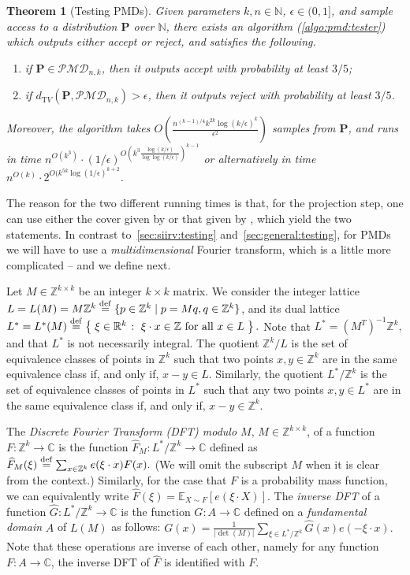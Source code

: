 \documentclass[11pt]{article}
\newtheorem{theorem}{Theorem}[section]
\theoremstyle{definition}
\newcommand{\R}{\mathbb{R}}
\newcommand{\C}{\mathbb{C}}
\newcommand{\Z}{\mathbb{Z}}
\newcommand{\N}{\mathbb{N}}
\newcommand{\E}{\mathbb{E}}
\newcommand{\p}{\mathbf{P}}
\newcommand{\dtv}{d_{\mathrm TV}}
\newcommand{\eps}{\epsilon}
\newcommand{\eqdef}{\stackrel{{\mathrm {\footnotesize def}}}{=}}
\newcommand{\setOfSuchThat}[2]{ \left\{\; #1 \;\colon\; #2\; \right\} } 			\newcommand{\clg}[1]{\left\lceil #1 \right\rceil}
\newcommand{\accept}{\textsf{accept}\xspace}
\newcommand{\reject}{\textsf{reject}\xspace}
\newcommand{\bigO}[1]{{O\left( #1 \right)}}
\newcommand{\classpmd}[2][n]{\ensuremath{\mathcal{PMD}_{#1,#2}}\xspace}
\begin{document}
\begin{theorem}[Testing PMDs]
    Given parameters $k,n\in\mathbb{N}$, $\eps\in(0,1]$, and sample access to a distribution $\p$ over $\N$, there exists an algorithm (\cref{algo:pmd:tester}) which outputs either \accept or \reject, and satisfies the following.
    \begin{enumerate}
        \item if $\p \in \classpmd[n]{k}$, then it outputs \accept with probability at least $3/5$;
        \item if $\dtv(\p,\classpmd[n]{k}) > \eps$, then it outputs \reject with probability at least $3/5$.
    \end{enumerate}
    Moreover, the algorithm takes $\bigO{\frac{n^{(k-1)/4} k^{2k} \log(k/\eps)^k}{\eps^2}}$ samples from $\p$, and runs in time $n^{O(k^3)} \cdot (1/\eps)^{O(k^3\frac{\log(k/\eps)}{\log\log(k/\eps)})^{k-1}}$ or alternatively in time $n^{O(k)} \cdot  2^{O(k^{5k} \log(1/\eps)^{k+2}}$.
\end{theorem}
The reason for the two different running times is that, for the projection step, one can use either the cover given by \cite{DKS15b} or that given by \cite{DDKT16}, which yield the two statements.
In contrast to~\cref{sec:siirv:testing} and~\cref{sec:general:testing}, for PMDs we will have to use a \emph{multidimensional} Fourier transform, which is a little more complicated -- and we define next.


Let $M \in \Z^{k \times k}$ be an integer $k \times k$ matrix.
We consider the integer lattice
$L  = L(M) =  M \Z^k \eqdef \{ p \in \Z^k \mid p = M q,  q \in \Z^k \}$, and its dual lattice
 $L^{\ast} = L^{\ast}(M)   \eqdef \setOfSuchThat{ \xi \in \R^k }{ \xi \cdot x \in \Z \textrm{ for all } x \in L }.$
 Note that  $L^{\ast} = (M^T)^{-1} \Z^k,$ and that $L^{\ast}$ is not necessarily integral.
The quotient $ \Z^k \slash L$ is the set of equivalence classes of points in $\Z^k$ such that two points $x, y \in \Z^k$
are in the same equivalence class if, and only if, $x - y \in L$.
Similarly, the quotient $L^{\ast} \slash \Z^k$ is the set of equivalence
classes of points in $L^{\ast}$ such that any two points $x, y \in L^{\ast}$ are in the same equivalence class if, and only if, $x -y \in \Z^k$.

The \emph{Discrete Fourier Transform (DFT) modulo $M$}, $M \in \Z^{k \times k}$, of a function
$F\colon \Z^k \to \C$ is  the function $\widehat{F}_M\colon L^{\ast} \slash \Z^k  \to \C$
defined as $\widehat{F}_M(\xi)\eqdef\sum_{x \in  \Z^k} e(\xi \cdot x) F(x).$ 
(We will omit the subscript $M$ when it is clear from the context.)
Similarly, for the case that $F$ is a probability mass function, we can equivalently write
$\widehat{F}(\xi)= \E_{X \sim F} \left[ e(\xi \cdot X) \right].$ The \emph{inverse DFT} of a function $\widehat{G}\colon L^{\ast} \slash \Z^k  \to \C$
is the function $G\colon A \to \C$ defined on a \emph{fundamental domain} $A$ of $L(M)$ as follows:
$G(x) = \frac{1}{|\det(M)|} \sum_{\xi \in L^{\ast} \slash \Z^k} \widehat{G}(x) e(- \xi \cdot x).$
Note that these operations are inverse of each other,
namely for any function $F\colon A \to \C$, the inverse DFT of $\widehat{F}$ is identified with  $F$.
\end{document}
